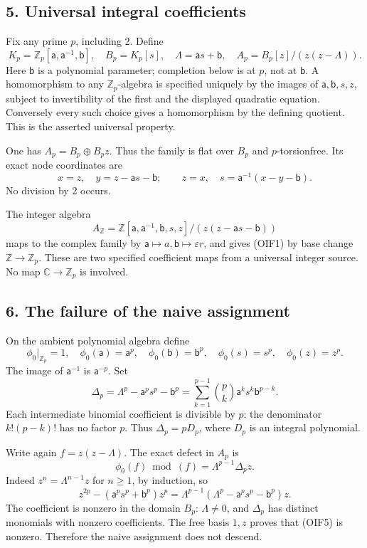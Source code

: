\documentclass[
]{article}
\begin{document}
\subsection{5. Universal integral
coefficients}\label{universal-integral-coefficients}

Fix any prime \(p\), including 2. Define \[
K_p=\mathbb Z_p[\mathsf a,\mathsf a^{-1},\mathsf b],\quad
B_p=K_p[s],\quad \Lambda=\mathsf a s+\mathsf b,\quad
A_p=B_p[z]/(z(z-\Lambda)).
\tag{OIF1}
\] Here \(\mathsf b\) is a polynomial parameter; completion below is at
\(p\), not at \(\mathsf b\). A homomorphism to any
\(\mathbb Z_p\)-algebra is specified uniquely by the images of
\(\mathsf a,\mathsf b,s,z\), subject to invertibility of the first and
the displayed quadratic equation. Conversely every such choice gives a
homomorphism by the defining quotient. This is the asserted universal
property.

One has \(A_p=B_p\oplus B_pz\). Thus the family is flat over \(B_p\) and
\(p\)-torsionfree. Its exact node coordinates are \[
x=z,\quad y=z-\mathsf a s-\mathsf b;
\qquad z=x,\quad s=\mathsf a^{-1}(x-y-\mathsf b).
\tag{OIF2}
\] No division by 2 occurs.

The integer algebra \[
A_{\mathbb Z}=
\mathbb Z[\mathsf a,\mathsf a^{-1},\mathsf b,s,z]/
(z(z-\mathsf a s-\mathsf b))
\] maps to the complex family by
\(\mathsf a\mapsto a,\mathsf b\mapsto\varepsilon r\), and gives (OIF1)
by base change \(\mathbb Z\to\mathbb Z_p\). These are two specified
coefficient maps from a universal integer source. No map
\(\mathbb C\to\mathbb Z_p\) is involved.

\subsection{6. The failure of the naive
assignment}\label{the-failure-of-the-naive-assignment}

On the ambient polynomial algebra define \[
\phi_0|_{\mathbb Z_p}=1,\quad
\phi_0(\mathsf a)=\mathsf a^p,\quad
\phi_0(\mathsf b)=\mathsf b^p,\quad
\phi_0(s)=s^p,\quad\phi_0(z)=z^p.
\tag{OIF3}
\] The image of \(\mathsf a^{-1}\) is \(\mathsf a^{-p}\). Set \[
\Delta_p=\Lambda^p-\mathsf a^ps^p-\mathsf b^p
=\sum_{k=1}^{p-1}\binom pk\mathsf a^ks^k\mathsf b^{p-k}.
\tag{OIF4}
\] Each intermediate binomial coefficient is divisible by \(p\): the
denominator \(k!(p-k)!\) has no factor \(p\). Thus \(\Delta_p=pD_p\),
where \(D_p\) is an integral polynomial.

Write again \(f=z(z-\Lambda)\). The exact defect in \(A_p\) is \[
\boxed{\phi_0(f)\bmod(f)=\Lambda^{p-1}\Delta_p z.}
\tag{OIF5}
\] Indeed \(z^n=\Lambda^{n-1}z\) for \(n\ge1\), by induction, so \[
z^{2p}-(\mathsf a^ps^p+\mathsf b^p)z^p
=\Lambda^{p-1}(\Lambda^p-\mathsf a^ps^p-\mathsf b^p)z.
\] The coefficient is nonzero in the domain \(B_p\): \(\Lambda\ne0\),
and \(\Delta_p\) has distinct monomials with nonzero coefficients. The
free basis \(1,z\) proves that (OIF5) is nonzero. Therefore the naive
assignment does not descend.
\end{document}
